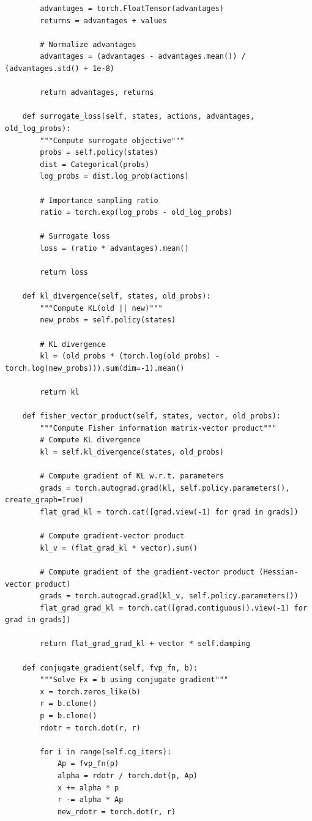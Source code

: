 \documentclass[12pt]{article}
\begin{document}
{{\begin{verbatim}
        advantages = torch.FloatTensor(advantages)
        returns = advantages + values

        # Normalize advantages
        advantages = (advantages - advantages.mean()) / (advantages.std() + 1e-8)

        return advantages, returns

    def surrogate_loss(self, states, actions, advantages, old_log_probs):
        """Compute surrogate objective"""
        probs = self.policy(states)
        dist = Categorical(probs)
        log_probs = dist.log_prob(actions)

        # Importance sampling ratio
        ratio = torch.exp(log_probs - old_log_probs)

        # Surrogate loss
        loss = (ratio * advantages).mean()

        return loss

    def kl_divergence(self, states, old_probs):
        """Compute KL(old || new)"""
        new_probs = self.policy(states)

        # KL divergence
        kl = (old_probs * (torch.log(old_probs) - torch.log(new_probs))).sum(dim=-1).mean()

        return kl

    def fisher_vector_product(self, states, vector, old_probs):
        """Compute Fisher information matrix-vector product"""
        # Compute KL divergence
        kl = self.kl_divergence(states, old_probs)

        # Compute gradient of KL w.r.t. parameters
        grads = torch.autograd.grad(kl, self.policy.parameters(), create_graph=True)
        flat_grad_kl = torch.cat([grad.view(-1) for grad in grads])

        # Compute gradient-vector product
        kl_v = (flat_grad_kl * vector).sum()

        # Compute gradient of the gradient-vector product (Hessian-vector product)
        grads = torch.autograd.grad(kl_v, self.policy.parameters())
        flat_grad_grad_kl = torch.cat([grad.contiguous().view(-1) for grad in grads])

        return flat_grad_grad_kl + vector * self.damping

    def conjugate_gradient(self, fvp_fn, b):
        """Solve Fx = b using conjugate gradient"""
        x = torch.zeros_like(b)
        r = b.clone()
        p = b.clone()
        rdotr = torch.dot(r, r)

        for i in range(self.cg_iters):
            Ap = fvp_fn(p)
            alpha = rdotr / torch.dot(p, Ap)
            x += alpha * p
            r -= alpha * Ap
            new_rdotr = torch.dot(r, r)


\end{verbatim}}}
\end{document}
